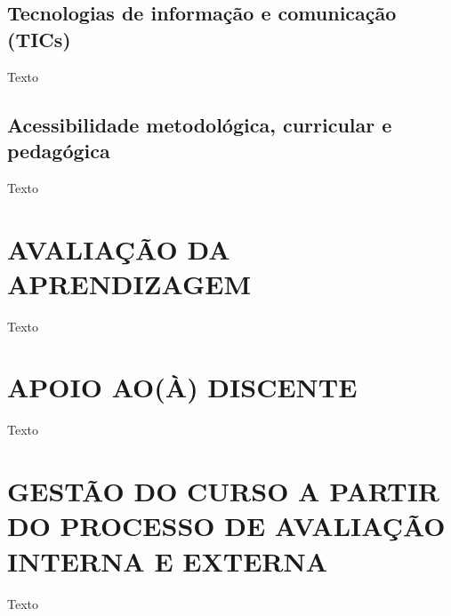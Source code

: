 \subsection{Tecnologias de informação e comunicação (TICs)}
Texto
\subsection{Acessibilidade metodológica, curricular e pedagógica}
Texto

\section{AVALIAÇÃO DA APRENDIZAGEM}
Texto

\section{APOIO AO(À) DISCENTE}
Texto

\section{GESTÃO DO CURSO A PARTIR DO PROCESSO DE AVALIAÇÃO INTERNA E EXTERNA}
Texto